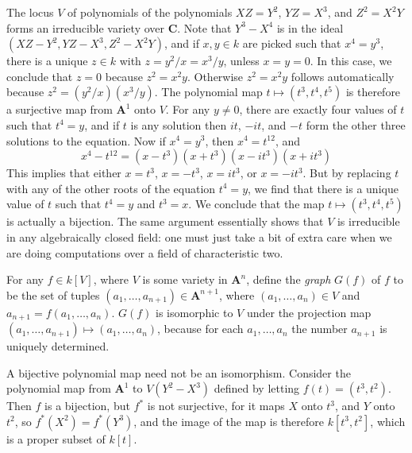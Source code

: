 \begin{example}
    The locus $V$ of polynomials of the polynomials $XZ = Y^2$, $YZ = X^3$, and $Z^2 = X^2Y$ forms an irreducible variety over $\mathbf{C}$. Note that $Y^3 - X^4$ is in the ideal $(XZ - Y^2, YZ - X^3, Z^2 - X^2Y)$, and if $x,y \in k$ are picked such that $x^4 = y^3$, there is a unique $z \in k$ with $z = y^2/x = x^3/y$, unless $x = y = 0$. In this case, we conclude that $z = 0$ because $z^2 = x^2y$. Otherwise $z^2 = x^2y$ follows automatically because $z^2 = (y^2/x)(x^3/y)$. The polynomial map $t \mapsto (t^3,t^4,t^5)$ is therefore a surjective map from $\mathbf{A}^1$ onto $V$. For any $y \neq 0$, there are exactly four values of $t$ such that $t^4 = y$, and if $t$ is any solution then $it$, $-it$, and $-t$ form the other three solutions to the equation. Now if $x^4 = y^3$, then $x^4 = t^{12}$, and
    \[ x^4 - t^{12} = (x - t^3)(x + t^3)(x - it^3)(x + it^3) \]
    This implies that either $x = t^3$, $x = -t^3$, $x = it^3$, or $x = -it^3$. But by replacing $t$ with any of the other roots of the equation $t^4 = y$, we find that there is a unique value of $t$ such that $t^4 = y$ and $t^3 = x$. We conclude that the map $t \mapsto (t^3,t^4,t^5)$ is actually a bijection. The same argument essentially shows that $V$ is irreducible in any algebraically closed field: one must just take a bit of extra care when we are doing computations over a field of characteristic two.
\end{example}

\begin{example}
    For any $f \in k[V]$, where $V$ is some variety in $\mathbf{A}^n$, define the \emph{graph} $G(f)$ of $f$ to be the set of tuples $(a_1, \dots, a_{n+1}) \in \mathbf{A}^{n+1}$, where $(a_1, \dots, a_n) \in V$ and $a_{n+1} = f(a_1, \dots, a_n)$. $G(f)$ is isomorphic to $V$ under the projection map $(a_1, \dots, a_{n+1}) \mapsto (a_1, \dots, a_n)$, because for each $a_1, \dots, a_n$ the number $a_{n+1}$ is uniquely determined.
\end{example}

\begin{example}
    A bijective polynomial map need not be an isomorphism. Consider the polynomial map from $\mathbf{A}^1$ to $V(Y^2-X^3)$ defined by letting $f(t) = (t^3,t^2)$. Then $f$ is a bijection, but $f^*$ is not surjective, for it maps $X$ onto $t^3$, and $Y$ onto $t^2$, so $f^*(X^2) = f^*(Y^3)$, and the image of the map is therefore $k[t^3,t^2]$, which is a proper subset of $k[t]$.
\end{example}

